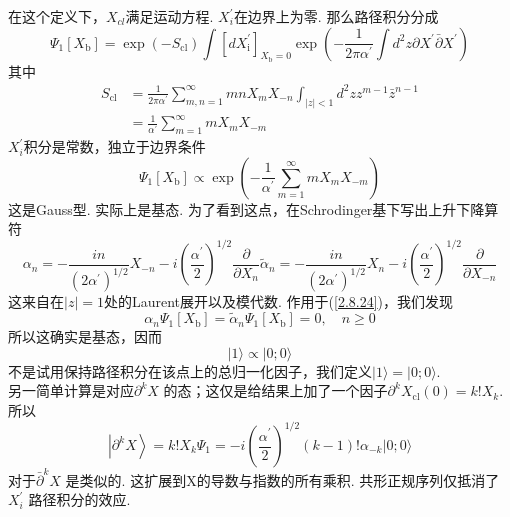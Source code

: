 在这个定义下，$X_{cl}$满足运动方程. $X_i^\prime$在边界上为零. 那么路径积分分成
\begin{equation}
\Psi_{1}\left[X_{\mathrm{b}}\right]=\exp \left(-S_{\mathrm{cl}}\right) \int\left[d X_{\mathrm{i}}^{\prime}\right]_{X_{\mathrm{b}}=0} \exp \left(-\frac{1}{2 \pi \alpha^{\prime}} \int d^{2} z \partial X^{\prime} \bar{\partial} X^{\prime}\right)
\end{equation}
其中
\begin{equation}
\begin{aligned}
S_{\mathrm{cl}} &=\frac{1}{2 \pi \alpha^{\prime}} \sum_{m, n=1}^{\infty} m n X_{m} X_{-n} \int_{|z|<1} d^{2} z z^{m-1} \bar{z}^{n-1} \\
&=\frac{1}{\alpha^{\prime}} \sum_{m=1}^{\infty} m X_{m} X_{-m}
\end{aligned}
\end{equation}
$X_i^\prime$积分是常数，独立于边界条件
\begin{equation}\label{2.8.24}
\Psi_{1}\left[X_{\mathrm{b}}\right] \propto \exp \left(-\frac{1}{\alpha^{\prime}} \sum_{m=1}^{\infty} m X_{m} X_{-m}\right)
\end{equation}
这是Gauss型. 实际上是基态. 为了看到这点，在Schrodinger基下写出上升下降算符
\begin{subequations}
\begin{equation}
\alpha_{n}=-\frac{i n}{\left(2 \alpha^{\prime}\right)^{1 / 2}} X_{-n}-i\left(\frac{\alpha^{\prime}}{2}\right)^{1 / 2} \frac{\partial}{\partial X_{n}}
\end{equation}
\begin{equation}
\tilde{\alpha}_{n}=-\frac{i n}{\left(2 \alpha^{\prime}\right)^{1 / 2}} X_{n}-i\left(\frac{\alpha^{\prime}}{2}\right)^{1 / 2} \frac{\partial}{\partial X_{-n}}
\end{equation}
\end{subequations}
这来自在$|z|=1$处的Laurent展开以及模代数. 作用于(\ref{2.8.24})，我们发现
\begin{equation}
\alpha_{n} \Psi_{1}\left[X_{\mathrm{b}}\right]=\tilde{\alpha}_{n} \Psi_{1}\left[X_{\mathrm{b}}\right]=0, \quad n \geq 0
\end{equation}
所以这确实是基态，因而
\begin{equation}
|1\rangle \propto|0 ; 0\rangle
\end{equation}
不是试用保持路径积分在该点上的总归一化因子，我们定义$|1\rangle =|0 ; 0\rangle$.\\
另一简单计算是对应$\partial^{k} X$ 的态；这仅是给结果上加了一个因子$\partial^{k} X_{\mathrm{cl}}(0)=k ! X_{k}$. 所以
\begin{equation}
\left|\partial^{k} X\right\rangle=k ! X_{k} \Psi_{1}=-i\left(\frac{\alpha^{\prime}}{2}\right)^{1 / 2}(k-1) ! \alpha_{-k}|0 ; 0\rangle
\end{equation}
对于$\bar{\partial}^{k} X$ 是类似的. 这扩展到X的导数与指数的所有乘积. 共形正规序列仅抵消了$X_i^\prime$ 路径积分的效应.

